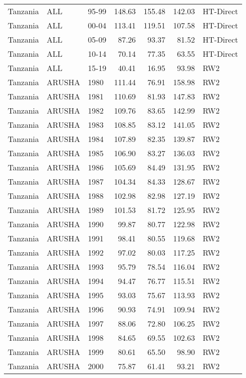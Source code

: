 \begin{longtable}{lllrrrl}
  Tanzania & ALL & 95-99 & 148.63 & 155.48 & 142.03 & HT-Direct \\ 
  Tanzania & ALL & 00-04 & 113.41 & 119.51 & 107.58 & HT-Direct \\ 
  Tanzania & ALL & 05-09 & 87.26 & 93.37 & 81.52 & HT-Direct \\ 
  Tanzania & ALL & 10-14 & 70.14 & 77.35 & 63.55 & HT-Direct \\ 
  Tanzania & ALL & 15-19 & 40.41 & 16.95 & 93.98 & RW2 \\ 
  Tanzania & ARUSHA & 1980 & 111.44 & 76.91 & 158.98 & RW2 \\ 
  Tanzania & ARUSHA & 1981 & 110.69 & 81.93 & 147.83 & RW2 \\ 
  Tanzania & ARUSHA & 1982 & 109.76 & 83.65 & 142.99 & RW2 \\ 
  Tanzania & ARUSHA & 1983 & 108.85 & 83.12 & 141.05 & RW2 \\ 
  Tanzania & ARUSHA & 1984 & 107.89 & 82.35 & 139.87 & RW2 \\ 
  Tanzania & ARUSHA & 1985 & 106.90 & 83.27 & 136.03 & RW2 \\ 
  Tanzania & ARUSHA & 1986 & 105.69 & 84.49 & 131.95 & RW2 \\ 
  Tanzania & ARUSHA & 1987 & 104.34 & 84.33 & 128.67 & RW2 \\ 
  Tanzania & ARUSHA & 1988 & 102.98 & 82.98 & 127.19 & RW2 \\ 
  Tanzania & ARUSHA & 1989 & 101.53 & 81.72 & 125.95 & RW2 \\ 
  Tanzania & ARUSHA & 1990 & 99.87 & 80.77 & 122.98 & RW2 \\ 
  Tanzania & ARUSHA & 1991 & 98.41 & 80.55 & 119.68 & RW2 \\ 
  Tanzania & ARUSHA & 1992 & 97.02 & 80.03 & 117.25 & RW2 \\ 
  Tanzania & ARUSHA & 1993 & 95.79 & 78.54 & 116.04 & RW2 \\ 
  Tanzania & ARUSHA & 1994 & 94.47 & 76.77 & 115.51 & RW2 \\ 
  Tanzania & ARUSHA & 1995 & 93.03 & 75.67 & 113.93 & RW2 \\ 
  Tanzania & ARUSHA & 1996 & 90.93 & 74.91 & 109.94 & RW2 \\ 
  Tanzania & ARUSHA & 1997 & 88.06 & 72.80 & 106.25 & RW2 \\ 
  Tanzania & ARUSHA & 1998 & 84.65 & 69.55 & 102.63 & RW2 \\ 
  Tanzania & ARUSHA & 1999 & 80.61 & 65.50 & 98.90 & RW2 \\ 
  Tanzania & ARUSHA & 2000 & 75.87 & 61.41 & 93.21 & RW2 \\ 

\end{longtable}
